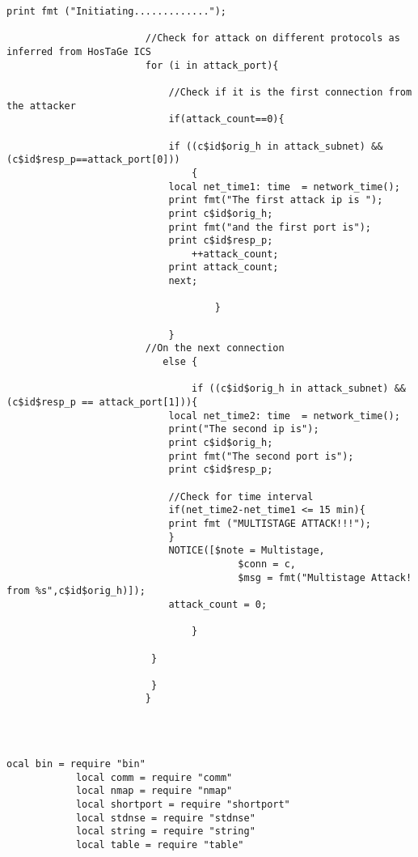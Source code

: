 \documentclass[article,msc=informatik,type=msc,colorback,accentcolor=tud9c]{tudthesis}
\begin{document}
\begin{appendix}
\begin{lstlisting}[caption=Bro Policy for Multistage Attack detected by HosTaGE ICS,label=lst:Bro Policy for Multistage Attack detected by HosTaGE ICS ]
  	      				print fmt ("Initiating.............");
  	      				
  	      				//Check for attack on different protocols as inferred from HosTaGe ICS
  	      				for (i in attack_port){
  	      				
  	      				 	//Check if it is the first connection from the attacker
  	      					if(attack_count==0){
  	      				
  	      					if ((c$id$orig_h in attack_subnet) && (c$id$resp_p==attack_port[0]))
  	      				        {
  	      					local net_time1: time  = network_time();
  	      					print fmt("The first attack ip is ");
  	      					print c$id$orig_h;
  	      					print fmt("and the first port is");
  	      					print c$id$resp_p;
  	      				        ++attack_count;
  	      					print attack_count;
  	      					next;
  	      					
  	      				       		}
  	      				
  	      					}
  	      				//On the next connection
  	      				   else {
  	      					
  	      				        if ((c$id$orig_h in attack_subnet) && (c$id$resp_p == attack_port[1])){
  	      					local net_time2: time  = network_time();
  	      					print("The second ip is");
  	      					print c$id$orig_h;
  	      					print fmt("The second port is");
  	      					print c$id$resp_p;
  	      					
  	      					//Check for time interval
  	      					if(net_time2-net_time1 <= 15 min){
  	      					print fmt ("MULTISTAGE ATTACK!!!");
  	      					}        
  	      					NOTICE([$note = Multistage,
  	      				                $conn = c,
  	      				                $msg = fmt("Multistage Attack! from %s",c$id$orig_h)]);
  	      					attack_count = 0;
  	      					
  	      				        }
  	      				
  	      				 }
  	      				
  	      				 }
  	      				}
  	      				
  	      				
  	      				
  	      				\end{lstlisting}
  	      				
  	      				
  	      	\newpage
  	      				
  	      	\begin{lstlisting}[caption= Nmap Modbus Discovery Script, label=lst:Nmap Modbus Discovery Script]
  	      	ocal bin = require "bin"
  	      	local comm = require "comm"
  	      	local nmap = require "nmap"
  	      	local shortport = require "shortport"
  	      	local stdnse = require "stdnse"
  	      	local string = require "string"
  	      	local table = require "table"
  	      	

\end{lstlisting}
\end{appendix}
\end{document}
